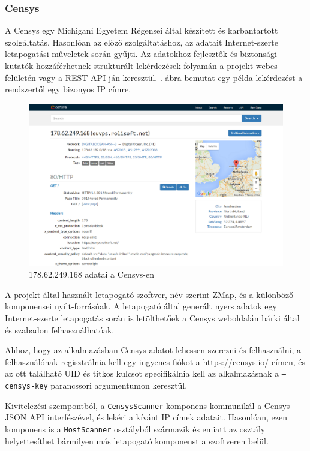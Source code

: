 \documentclass[a4paper,12pt]{article}
\begin{document}
\subsubsection{Censys} \label{ssec:censys}

	A Censys\cite{censys15} egy Michigani Egyetem Régensei által készített és karbantartott szolgáltatás. Hasonlóan az előző szolgáltatáshoz, az adatait Internet-szerte letapogatási műveletek során gyűjti. Az adatokhoz fejlesztők és biztonsági kutatók hozzáférhetnek strukturált lekérdezések folyamán a projekt webes felületén vagy a REST API-ján keresztül. \Az{\ref{censysscr}}. ábra bemutat egy példa lekérdezést a rendszertől egy bizonyos IP címre.
	
	\begin{figure}[!htbp]
		\centering
		\includegraphics[scale=0.355]{censys.png}
		\caption{178.62.249.168 adatai a Censys-en}
		\label{censysscr}
	\end{figure}
	
	A projekt által használt letapogató szoftver, név szerint ZMap\cite{zmap13}, és a különböző komponensei nyílt-forrásúak. A letapogató által generált nyers adatok egy Internet-szerte letapogatás során is letölthetőek a Censys weboldalán bárki által és szabadon felhasználhatóak.
	
	Ahhoz, hogy az alkalmazásban Censys adatot lehessen szerezni és felhasználni, a felhasználónak regisztrálnia kell egy ingyenes fiókot a \url{https://censys.io/} címen, és az ott található UID és titkos kulcsot specifikálnia kell az alkalmazásnak a \texttt{--censys-key} parancssori argumentumon keresztül.
	
	Kivitelezési szempontból, a \texttt{CensysScanner} komponens kommunikál a Censys JSON API interfészével, és lekéri a kívánt IP címek adatait. Hasonlóan, ezen komponens is a \texttt{HostScanner} osztályból származik és emiatt az osztály helyettesíthet bármilyen más letapogató komponenst a szoftveren belül.
\end{document}
